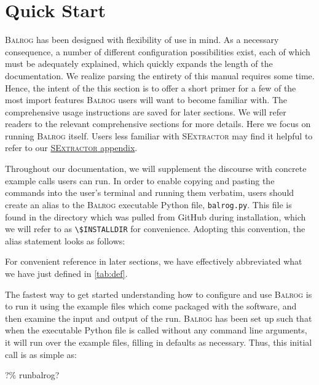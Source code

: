 \documentclass[11pt]{book}
\newcommand{\codett}[1]{\lstinline{#1}}
\newcommand{\py}{Python}
\newcommand{\balrog}{\textsc{Balrog}}
\newcommand{\sex}{\textsc{SExtractor}}
\newcommand{\bcmd}{\% runbalrog}
\begin{document}
\chapter{Quick Start}
\label{sec:quick}

\balrog{} has been designed with flexibility of use in mind. As a necessary consequence, 
a number of different configuration possibilities exist, each of which must be
adequately explained, which quickly expands the length of the documentation.
We realize parsing the entirety of this manual requires some time.
Hence, the intent of the this section is to offer a short primer for a few of the most import features
\balrog{} users will want to become familiar with.
The comprehensive usage instructions are saved for later sections.
We will refer readers to the relevant comprehensive sections for more details.
Here we focus on running \balrog{} itself.
Users less familiar with \sex{} may find it helpful to refer to our \hyperref[sec:quicksex]{\sex{} appendix}.

Throughout our documentation, we will supplement the discourse with concrete example calls users can run.
In order to enable copying and pasting the commands into the user's terminal and running them verbatim,
users should create an alias to the \balrog{} executable \py{} file, \codett{balrog.py}. 
This file is found in the directory which was pulled from GitHub during installation,
which we will refer to as \codett{\$INSTALLDIR} for convenience.
Adopting this convention, the alias statement looks as follows:

\begin{cmdline}
\end{cmdline}

\noindent For convenient reference in later sections, we have effectively 
abbreviated what we have just defined in \autoref{tab:def}.

The fastest way to get started understanding how to configure and use \balrog{} is to
run it using the example files which come packaged with the software, and then examine the input
and output of the run. 
\balrog{} has been set up such that when the executable \py{}
file is called without any command line arguments, it will run over
the example files, filling in defaults as necessary. 
Thus, this initial call is as simple as:

\begin{cmdline}
?\bcmd{}?
\end{cmdline}
\end{document}
